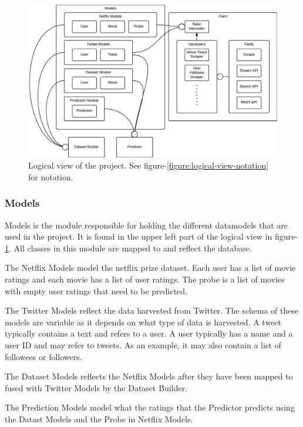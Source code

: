 \begin{center}
\begin{figure}[H]
\centerline{\includegraphics[width=7in]{image/architecture-logical-view.png}}
\caption{Logical view of the project. See figure-\ref{figure:logical-view-notation} for notation.}
\label{figure:logical-view}
\end{figure}
\end{center}

\subsubsection{Models}
Models is the module responsible for holding the different datamodels that are used in the project. It is found in the upper left part of the logical view in figure-\ref{figure:logical-view}. All classes in this module are mapped to and reflect the database.

The Netflix Models model the netflix prize dataset. Each user has a list of movie ratings and each movie has a list of user ratings. The probe is a list of movies with empty user ratings that need to be predicted.

The Twitter Models reflect the data harvested from Twitter. The schema of these models are variable as it depends on what type of data is harvested. A tweet typically contains a text and refers to a user. A user typically has a name and a user ID and may refer to tweets. As an example, it may also contain a list of followees or followers.

The Dataset Models reflects the Netflix Models after they have been mapped to fused with Twitter Models by the Dataset Builder.

The Prediction Models model what the ratings that the Predictor predicts using the Datast Models and the Probe in Netflix Models.

